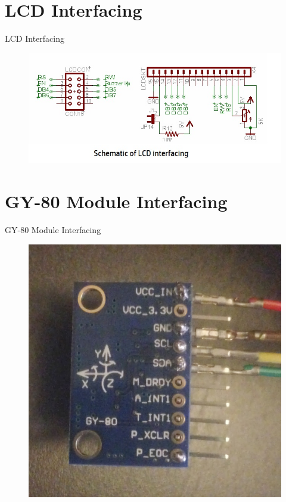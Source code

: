 \documentclass[10pt, a4paper]{beamer}
\begin{document}
\section{LCD Interfacing}
\begin{frame}{LCD Interfacing}
	\begin{figure}
		\includegraphics[scale=0.5]{LCD.jpg}
	\end{figure}
\end{frame}

\section{GY-80 Module Interfacing}
\begin{frame}{GY-80 Module Interfacing}
	\begin{figure}
		\includegraphics[scale=0.15]{gy80.jpg}
	\end{figure}
\end{frame}
\end{document}
